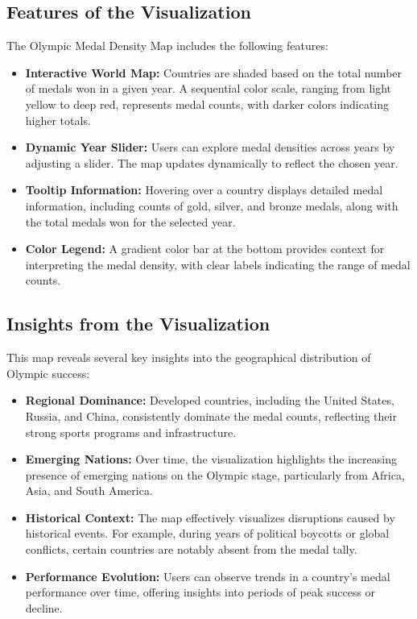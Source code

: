 \subsection{Features of the Visualization}
The Olympic Medal Density Map includes the following features:
\begin{itemize}
    \item \textbf{Interactive World Map:} Countries are shaded based on the total number of medals won in a given year. A sequential color scale, ranging from light yellow to deep red, represents medal counts, with darker colors indicating higher totals.
    \item \textbf{Dynamic Year Slider:} Users can explore medal densities across years by adjusting a slider. The map updates dynamically to reflect the chosen year.
    \item \textbf{Tooltip Information:} Hovering over a country displays detailed medal information, including counts of gold, silver, and bronze medals, along with the total medals won for the selected year.
    \item \textbf{Color Legend:} A gradient color bar at the bottom provides context for interpreting the medal density, with clear labels indicating the range of medal counts.
\end{itemize}

\subsection{Insights from the Visualization}
This map reveals several key insights into the geographical distribution of Olympic success:
\begin{itemize}
    \item \textbf{Regional Dominance:} Developed countries, including the United States, Russia, and China, consistently dominate the medal counts, reflecting their strong sports programs and infrastructure.
    \item \textbf{Emerging Nations:} Over time, the visualization highlights the increasing presence of emerging nations on the Olympic stage, particularly from Africa, Asia, and South America.
    \item \textbf{Historical Context:} The map effectively visualizes disruptions caused by historical events. For example, during years of political boycotts or global conflicts, certain countries are notably absent from the medal tally.
    \item \textbf{Performance Evolution:} Users can observe trends in a country's medal performance over time, offering insights into periods of peak success or decline.
\end{itemize}

